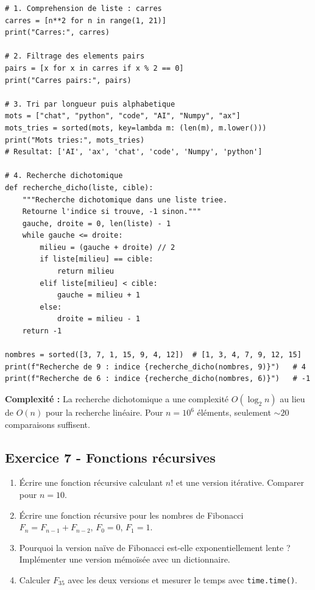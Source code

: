 \documentclass[12pt,a4paper]{article}
\begin{document}
\begin{boitecorrige}
\begin{lstlisting}
# 1. Comprehension de liste : carres
carres = [n**2 for n in range(1, 21)]
print("Carres:", carres)

# 2. Filtrage des elements pairs
pairs = [x for x in carres if x % 2 == 0]
print("Carres pairs:", pairs)

# 3. Tri par longueur puis alphabetique
mots = ["chat", "python", "code", "AI", "Numpy", "ax"]
mots_tries = sorted(mots, key=lambda m: (len(m), m.lower()))
print("Mots tries:", mots_tries)
# Resultat: ['AI', 'ax', 'chat', 'code', 'Numpy', 'python']

# 4. Recherche dichotomique
def recherche_dicho(liste, cible):
    """Recherche dichotomique dans une liste triee.
    Retourne l'indice si trouve, -1 sinon."""
    gauche, droite = 0, len(liste) - 1
    while gauche <= droite:
        milieu = (gauche + droite) // 2
        if liste[milieu] == cible:
            return milieu
        elif liste[milieu] < cible:
            gauche = milieu + 1
        else:
            droite = milieu - 1
    return -1

nombres = sorted([3, 7, 1, 15, 9, 4, 12])  # [1, 3, 4, 7, 9, 12, 15]
print(f"Recherche de 9 : indice {recherche_dicho(nombres, 9)}")   # 4
print(f"Recherche de 6 : indice {recherche_dicho(nombres, 6)}")   # -1
\end{lstlisting}

\textbf{Complexité :} La recherche dichotomique a une complexité $O(\log_2 n)$ au lieu de $O(n)$ pour la recherche linéaire. Pour $n = 10^6$ éléments, seulement $\sim 20$ comparaisons suffisent.
\end{boitecorrige}

\subsection*{Exercice 7 - Fonctions récursives \niveau{\moyen}}

\begin{boiteexercice}
\begin{enumerate}
  \item Écrire une fonction récursive calculant $n!$ et une version itérative. Comparer pour $n=10$.
  \item Écrire une fonction récursive pour les nombres de Fibonacci $F_n = F_{n-1}+F_{n-2}$, $F_0=0$, $F_1=1$.
  \item Pourquoi la version naïve de Fibonacci est-elle exponentiellement lente ? Implémenter une version mémoïsée avec un dictionnaire.
  \item Calculer $F_{35}$ avec les deux versions et mesurer le temps avec \texttt{time.time()}.
\end{enumerate}
\end{boiteexercice}
\end{document}
